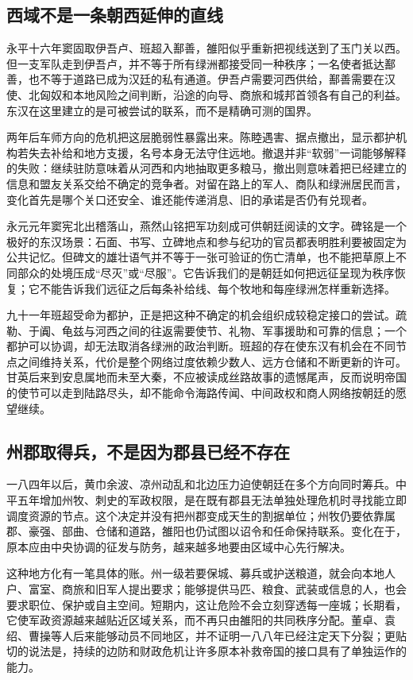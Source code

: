 \subsection{西域不是一条朝西延伸的直线}

永平十六年窦固取伊吾卢、班超入鄯善，雒阳似乎重新把视线送到了玉门关以西。但一支军队走到伊吾卢，并不等于所有绿洲都接受同一种秩序；一名使者抵达鄯善，也不等于道路已成为汉廷的私有通道。伊吾卢需要河西供给，鄯善需要在汉使、北匈奴和本地风险之间判断，沿途的向导、商旅和城邦首领各有自己的利益。东汉在这里建立的是可被尝试的联系，而不是精确可测的国界。

两年后车师方向的危机把这层脆弱性暴露出来。陈睦遇害、据点撤出，显示都护机构若失去补给和地方支援，名号本身无法守住远地。撤退并非“软弱”一词能够解释的失败：继续驻防意味着从河西和内地抽取更多粮马，撤出则意味着把已经建立的信息和盟友关系交给不确定的竞争者。对留在路上的军人、商队和绿洲居民而言，变化首先是哪个关口还安全、谁还能传递消息、旧的承诺是否仍有兑现者。

永元元年窦宪北出稽落山，燕然山铭把军功刻成可供朝廷阅读的文字。碑铭是一个极好的东汉场景：石面、书写、立碑地点和参与纪功的官员都表明胜利要被固定为公共记忆。但碑文的雄壮语气并不等于一张可验证的伤亡清单，也不能把草原上不同部众的处境压成“尽灭”或“尽服”。它告诉我们的是朝廷如何把远征呈现为秩序恢复；它不能告诉我们远征之后每条补给线、每个牧地和每座绿洲怎样重新选择。

九十一年班超受命为都护，正是把这种不确定的机会组织成较稳定接口的尝试。疏勒、于阗、龟兹与河西之间的往返需要使节、礼物、军事援助和可靠的信息；一个都护可以协调，却无法取消各绿洲的政治判断。班超的存在使东汉有机会在不同节点之间维持关系，代价是整个网络过度依赖少数人、远方仓储和不断更新的许可。甘英后来到安息属地而未至大秦，不应被读成丝路故事的遗憾尾声，反而说明帝国的使节可以走到陆路尽头，却不能命令海路传闻、中间政权和商人网络按朝廷的愿望继续。

\subsection{州郡取得兵，不是因为郡县已经不存在}

一八四年以后，黄巾余波、凉州动乱和北边压力迫使朝廷在多个方向同时筹兵。中平五年增加州牧、刺史的军政权限，是在既有郡县无法单独处理危机时寻找能立即调度资源的节点。这个决定并没有把州郡变成天生的割据单位；州牧仍要依靠属郡、豪强、部曲、仓储和道路，雒阳也仍试图以诏令和任命保持联系。变化在于，原本应由中央协调的征发与防务，越来越多地要由区域中心先行解决。

这种地方化有一笔具体的账。州一级若要保城、募兵或护送粮道，就会向本地人户、富室、商旅和旧军人提出要求；能够提供马匹、粮食、武装或信息的人，也会要求职位、保护或自主空间。短期内，这让危险不会立刻穿透每一座城；长期看，它使军政资源越来越贴近区域关系，而不再只由雒阳的共同秩序分配。董卓、袁绍、曹操等人后来能够动员不同地区，并不证明一八八年已经注定天下分裂；更贴切的说法是，持续的边防和财政危机让许多原本补救帝国的接口具有了单独运作的能力。

